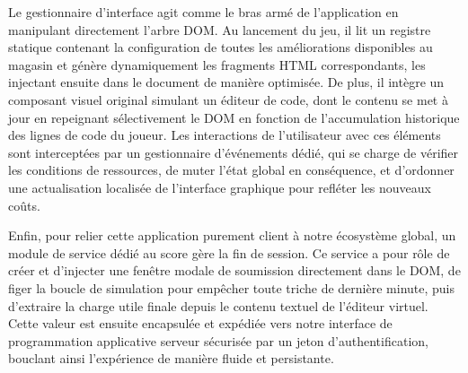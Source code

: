 Le gestionnaire d'interface agit comme le bras armé de l'application en manipulant directement l'arbre DOM. Au lancement du jeu, il lit un registre statique contenant la configuration de toutes les améliorations disponibles au magasin et génère dynamiquement les fragments HTML correspondants, les injectant ensuite dans le document de manière optimisée. De plus, il intègre un composant visuel original simulant un éditeur de code, dont le contenu se met à jour en repeignant sélectivement le DOM en fonction de l'accumulation historique des lignes de code du joueur. Les interactions de l'utilisateur avec ces éléments sont interceptées par un gestionnaire d'événements dédié, qui se charge de vérifier les conditions de ressources, de muter l'état global en conséquence, et d'ordonner une actualisation localisée de l'interface graphique pour refléter les nouveaux coûts.

Enfin, pour relier cette application purement client à notre écosystème global, un module de service dédié au score gère la fin de session. Ce service a pour rôle de créer et d'injecter une fenêtre modale de soumission directement dans le DOM, de figer la boucle de simulation pour empêcher toute triche de dernière minute, puis d'extraire la charge utile finale depuis le contenu textuel de l'éditeur virtuel. Cette valeur est ensuite encapsulée et expédiée vers notre interface de programmation applicative serveur sécurisée par un jeton d'authentification, bouclant ainsi l'expérience de manière fluide et persistante.